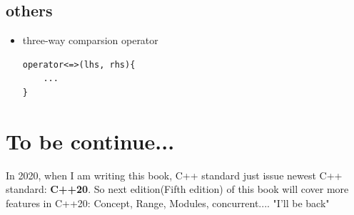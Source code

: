 \documentclass[a4paper,11pt,twoside]{book}
\begin{document}


\subsection{others}
\begin{itemize}
	\item three-way comparsion operator
\begin{lstlisting}
operator<=>(lhs, rhs){
	...
}
\end{lstlisting}	


\end{itemize}

\section{To be continue...}
In 2020, when I am writing this book,  C++ standard just issue newest C++ standard: \textbf{C++20}. So next edition(Fifth edition) of this book will cover more features in C++20: Concept, Range, Modules, concurrent....
\newline
"I'll be back"


\end{document}
